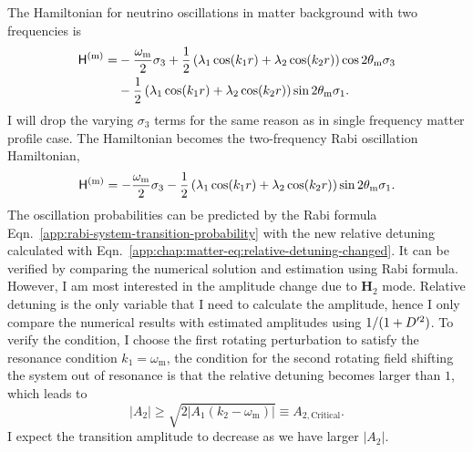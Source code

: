 The Hamiltonian for neutrino oscillations in matter background with two frequencies is
\begin{align}
  \mathsf H^{(\mm)} =& - \frac{\omega_\mm}{2}\sigma_3  + \frac{1}{2} \left( \lambda_1 \cos(k_1 r) + \lambda_2 \cos(k_2 r) \right) \cos 2\theta_\mm \sigma_3 \nonumber\\
   &- \frac{1}{2} \left( \lambda_1 \cos(k_1 r) + \lambda_2 \cos(k_2 r)\right)\sin 2\theta_\mm \sigma_1.
  \label{eq-hamiltonian-bg-matter-basis-multi-frequency}
\end{align}
I will drop the varying $\sigma_3$ terms for the same reason as in single frequency matter profile case. The Hamiltonian becomes the two-frequency Rabi oscillation Hamiltonian,
\begin{equation}
  \mathsf H^{(\mm)} = - \frac{\omega_\mm}{2}\sigma_3  - \frac{1}{2} \left( \lambda_1 \cos(k_1 r) + \lambda_2 \cos(k_2 r)\right)\sin 2\theta_\mm \sigma_1.
  \label{eq-hamiltonian-bg-matter-basis-multi-frequency-drop-varying-sigma3}
\end{equation}
The oscillation probabilities can be predicted by the Rabi formula Eqn.~\ref{app:rabi-system-transition-probability} with the new relative detuning calculated with Eqn.~\ref{app:chap:matter-eq:relative-detuning-changed}. It can be verified by comparing the numerical solution and estimation using Rabi formula. However, I am most interested in the amplitude change due to $\mathbf H_2$ mode. Relative detuning is the only variable that I need to calculate the amplitude, hence I only compare the numerical results with estimated amplitudes using $1/(1+D'^2)$.
To verify the condition, I choose the first rotating perturbation to satisfy the resonance condition $k_1=\omega_{\mathrm{m}}$, the condition for the second rotating field shifting the system out of resonance is that the relative detuning becomes larger than $1$, which leads to
\begin{equation}
\lvert A_2 \rvert \geq \sqrt{2 \lvert A_1 (k_2-\omega_{\mathrm m})\rvert} \equiv A_{2,\mathrm{Critical}}.
\end{equation}
I expect the transition amplitude to decrease as we have larger $\lvert A_2\rvert$.


